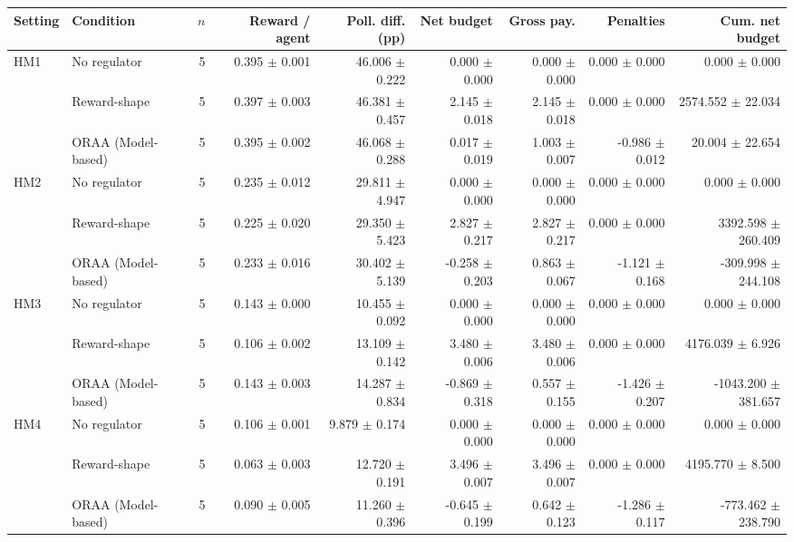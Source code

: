 \begin{tabular}{llrrrrrrr}
\toprule
Setting & Condition & $n$ & Reward / agent & Poll. diff. (pp) & Net budget & Gross pay. & Penalties & Cum. net budget \\
\midrule
HM1 & No regulator & 5 & 0.395 $\pm$ 0.001 & 46.006 $\pm$ 0.222 & 0.000 $\pm$ 0.000 & 0.000 $\pm$ 0.000 & 0.000 $\pm$ 0.000 & 0.000 $\pm$ 0.000 \\
 & Reward-shape & 5 & 0.397 $\pm$ 0.003 & 46.381 $\pm$ 0.457 & 2.145 $\pm$ 0.018 & 2.145 $\pm$ 0.018 & 0.000 $\pm$ 0.000 & 2574.552 $\pm$ 22.034 \\
 & ORAA (Model-based) & 5 & 0.395 $\pm$ 0.002 & 46.068 $\pm$ 0.288 & 0.017 $\pm$ 0.019 & 1.003 $\pm$ 0.007 & -0.986 $\pm$ 0.012 & 20.004 $\pm$ 22.654 \\
\addlinespace
HM2 & No regulator & 5 & 0.235 $\pm$ 0.012 & 29.811 $\pm$ 4.947 & 0.000 $\pm$ 0.000 & 0.000 $\pm$ 0.000 & 0.000 $\pm$ 0.000 & 0.000 $\pm$ 0.000 \\
 & Reward-shape & 5 & 0.225 $\pm$ 0.020 & 29.350 $\pm$ 5.423 & 2.827 $\pm$ 0.217 & 2.827 $\pm$ 0.217 & 0.000 $\pm$ 0.000 & 3392.598 $\pm$ 260.409 \\
 & ORAA (Model-based) & 5 & 0.233 $\pm$ 0.016 & 30.402 $\pm$ 5.139 & -0.258 $\pm$ 0.203 & 0.863 $\pm$ 0.067 & -1.121 $\pm$ 0.168 & -309.998 $\pm$ 244.108 \\
\addlinespace
HM3 & No regulator & 5 & 0.143 $\pm$ 0.000 & 10.455 $\pm$ 0.092 & 0.000 $\pm$ 0.000 & 0.000 $\pm$ 0.000 & 0.000 $\pm$ 0.000 & 0.000 $\pm$ 0.000 \\
 & Reward-shape & 5 & 0.106 $\pm$ 0.002 & 13.109 $\pm$ 0.142 & 3.480 $\pm$ 0.006 & 3.480 $\pm$ 0.006 & 0.000 $\pm$ 0.000 & 4176.039 $\pm$ 6.926 \\
 & ORAA (Model-based) & 5 & 0.143 $\pm$ 0.003 & 14.287 $\pm$ 0.834 & -0.869 $\pm$ 0.318 & 0.557 $\pm$ 0.155 & -1.426 $\pm$ 0.207 & -1043.200 $\pm$ 381.657 \\
\addlinespace
HM4 & No regulator & 5 & 0.106 $\pm$ 0.001 & 9.879 $\pm$ 0.174 & 0.000 $\pm$ 0.000 & 0.000 $\pm$ 0.000 & 0.000 $\pm$ 0.000 & 0.000 $\pm$ 0.000 \\
 & Reward-shape & 5 & 0.063 $\pm$ 0.003 & 12.720 $\pm$ 0.191 & 3.496 $\pm$ 0.007 & 3.496 $\pm$ 0.007 & 0.000 $\pm$ 0.000 & 4195.770 $\pm$ 8.500 \\
 & ORAA (Model-based) & 5 & 0.090 $\pm$ 0.005 & 11.260 $\pm$ 0.396 & -0.645 $\pm$ 0.199 & 0.642 $\pm$ 0.123 & -1.286 $\pm$ 0.117 & -773.462 $\pm$ 238.790 \\

\end{tabular}
